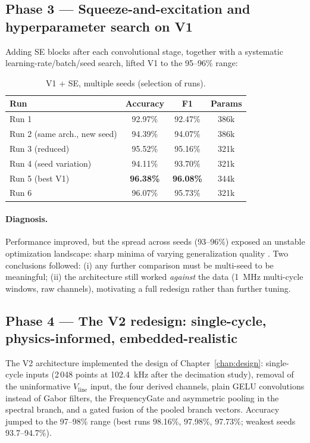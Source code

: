 \subsection{Phase 3 --- Squeeze-and-excitation and hyperparameter search on V1}

Adding SE blocks after each convolutional stage, together with a systematic learning-rate/batch/seed search, lifted V1 to the 95--96\% range:

\begin{table}[H]
\centering
\caption{V1 + SE, multiple seeds (selection of runs).}
\label{tab:phase3}
\renewcommand{\arraystretch}{1.25}
\small
\begin{tabular}{|l|c|c|c|}
\hline
\textbf{Run} & \textbf{Accuracy} & \textbf{F1} & \textbf{Params} \\
\hline
Run 1 & 92.97\% & 92.47\% & 386k \\
\hline
Run 2 (same arch., new seed) & 94.39\% & 94.07\% & 386k \\
\hline
Run 3 (reduced) & 95.52\% & 95.16\% & 321k \\
\hline
Run 4 (seed variation) & 94.11\% & 93.70\% & 321k \\
\hline
Run 5 (best V1) & \textbf{96.38\%} & \textbf{96.08\%} & 344k \\
\hline
Run 6 & 96.07\% & 95.73\% & 321k \\
\hline
\end{tabular}
\end{table}

\paragraph{Diagnosis.} Performance improved, but the spread across seeds (93--96\%) exposed an unstable optimization landscape: sharp minima of varying generalization quality \cite{keskar2017large}. Two conclusions followed: (i) any further comparison must be multi-seed to be meaningful; (ii) the architecture still worked \emph{against} the data (1~MHz multi-cycle windows, raw channels), motivating a full redesign rather than further tuning.

\subsection{Phase 4 --- The V2 redesign: single-cycle, physics-informed, embedded-realistic}

The V2 architecture implemented the design of Chapter~\ref{chap:design}: single-cycle inputs (2\,048 points at 102.4~kHz after the decimation study), removal of the uninformative $V_{\text{line}}$ input, the four derived channels, plain GELU convolutions instead of Gabor filters, the FrequencyGate and asymmetric pooling in the spectral branch, and a gated fusion of the pooled branch vectors. Accuracy jumped to the 97--98\% range (best runs 98.16\%, 97.98\%, 97.73\%; weakest seeds 93.7--94.7\%).

